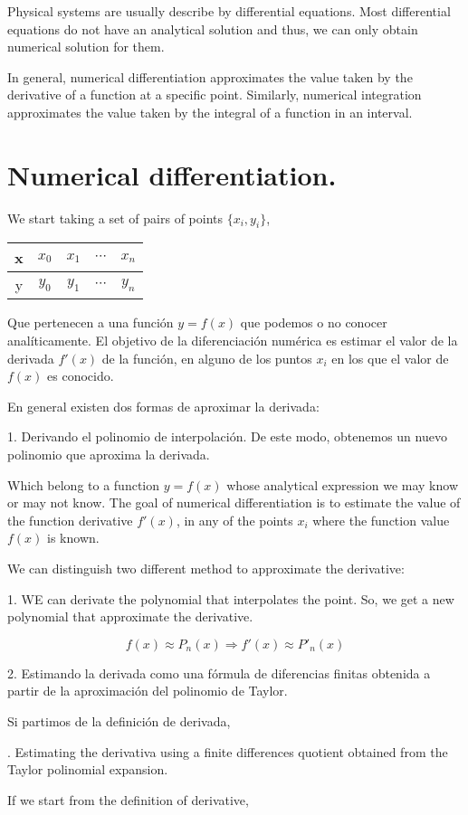 \begin{paracol}{2}
Physical systems are usually describe by differential equations. Most differential equations do not have an analytical solution and thus, we can only obtain numerical solution for them.

In general, numerical differentiation approximates the value taken by the derivative of a function at a specific point. Similarly, numerical integration approximates the value taken by the integral of a function in an interval.

\section{Numerical differentiation.}
We start taking a set of pairs of points $\{x_i,y_i\}$,
\end{paracol}

\begin{table}[h]
\centering
\begin{tabular}{c|cccc}
x&$x_0$&$x_1$&$\cdots$&$x_n$\\
\hline
y&$y_0$&$y_1$&$\cdots$&$y_n$
\end{tabular}
\end{table} 
\begin{paracol}{2}
Que pertenecen a una función $y=f(x)$ que podemos o no conocer analíticamente. El objetivo de la diferenciación numérica es estimar el valor de la derivada $f'(x)$ de la función, en alguno de los puntos $x_i$ en los que el valor de $f(x)$ es conocido. 

En general existen dos formas de aproximar la derivada:

1. Derivando el polinomio de interpolación. De este modo, obtenemos un nuevo polinomio que aproxima la derivada.

\switchcolumn	
Which belong to a function $y = f(x)$ whose analytical expression we may know or may not know. The goal of numerical differentiation is to estimate the value of the function derivative $f'(x)$, in any of the points $x_i$ where the function value $f(x)$ is known.

We can distinguish two different method to approximate the derivative:

1. WE can derivate the polynomial that interpolates the point. So, we get a new polynomial that approximate the derivative.  
\end{paracol}
\begin{equation*}
f(x)\approx P_n(x) \Rightarrow f'(x) \approx P'_n(x)
\end{equation*}
\begin{paracol}{2}
2. Estimando la derivada como una fórmula de diferencias finitas obtenida a partir de la aproximación del polinomio de Taylor. 

Si partimos de la definición de derivada,

. Estimating the derivativa using a finite differences quotient obtained from the Taylor polinomial expansion.

If we start from the definition of derivative,
\end{paracol} 
